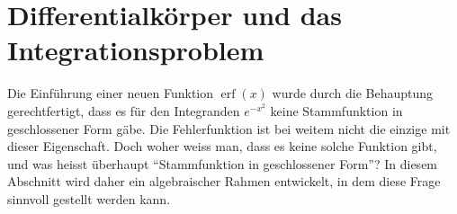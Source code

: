 %
%
%
\section{Differentialkörper und das Integrationsproblem
\label{buch:integrale:section:dkoerper}}
Die Einführung einer neuen Funktion $\operatorname{erf}(x)$ wurde
durch die Behauptung gerechtfertigt, dass es für den Integranden
$e^{-x^2}$ keine Stammfunktion in geschlossener Form gäbe.
Die Fehlerfunktion ist bei weitem nicht die einzige mit dieser
Eigenschaft.
Doch woher weiss man, dass es keine solche Funktion gibt, und
was heisst überhaupt ``Stammfunktion in geschlossener Form''?
In diesem Abschnitt wird daher ein algebraischer Rahmen entwickelt,
in dem diese Frage sinnvoll gestellt werden kann.







